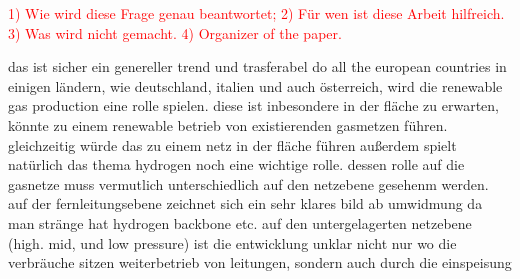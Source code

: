 \textcolor{red}{1) Wie wird diese Frage genau beantwortet; 2) Für wen ist diese Arbeit hilfreich. 3) Was wird nicht gemacht. 4) Organizer of the paper.}










das ist sicher ein genereller trend und trasferabel do all the european countries
in einigen ländern, wie deutschland, italien und auch österreich, wird die renewable gas production eine rolle spielen.
diese ist inbesondere in der fläche zu erwarten, könnte zu einem renewable betrieb von existierenden gasmetzen führen.
gleichzeitig würde das zu einem netz in der fläche führen 
außerdem spielt natürlich das thema hydrogen noch eine wichtige rolle. dessen rolle auf die gasnetze muss vermutlich unterschiedlich auf den netzebene gesehenm werden.
auf der fernleitungsebene zeichnet sich ein sehr klares bild ab
umwidmung da man stränge hat 
hydrogen backbone etc.
auf den untergelagerten netzebene (high. mid, und low pressure) ist die entwicklung unklar 
nicht nur wo die verbräuche sitzen weiterbetrieb von leitungen, sondern auch durch die einspeisung














